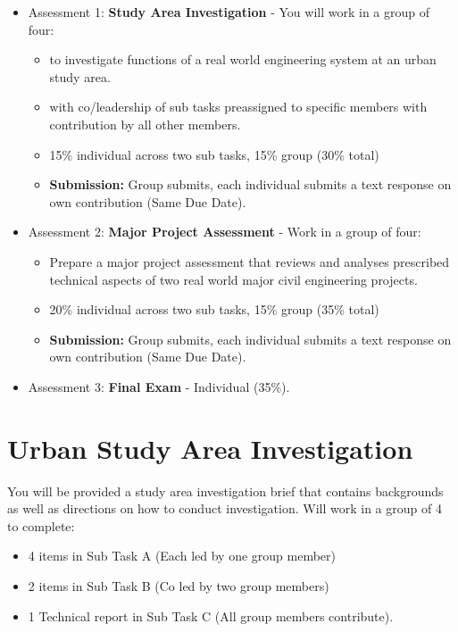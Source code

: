 \documentclass{report}
\begin{document}
	\begin{itemize}
		\item Assessment 1: \textbf{Study Area Investigation} - You will work in a group of four:
		\begin{itemize}
			\item to investigate functions of a real world engineering system at an urban study area. 
			\item with co/leadership of sub tasks preassigned to specific members with contribution by all other members.
			\item 15\% individual across two sub tasks, 15\% group (30\% total)
			\item \textbf{Submission:} Group submits, each individual submits a text response on own contribution (Same Due Date).
		\end{itemize}
		\item Assessment 2: \textbf{Major Project Assessment} - Work in a group of four:
		\begin{itemize}
			\item Prepare a major project assessment that reviews and analyses prescribed technical aspects of two real world major civil engineering projects.
			\item 20\% individual across two sub tasks, 15\% group (35\% total)
			\item \textbf{Submission:} Group submits, each individual submits a text response on own contribution (Same Due Date).
		\end{itemize}
		\item Assessment 3: \textbf{Final Exam} - Individual (35\%).
	\end{itemize}

	\section{Urban Study Area Investigation}
	You will be provided a study area investigation brief that contains backgrounds as well as directions on how to conduct investigation. Will work in a group of 4 to complete:

	\begin{itemize}
		\item 4 items in Sub Task A (Each led by one group member)
		\item 2 items in Sub Task B (Co led by two group members)
		\item 1 Technical report in Sub Task C (All group members contribute).
	\end{itemize}
\end{document}
